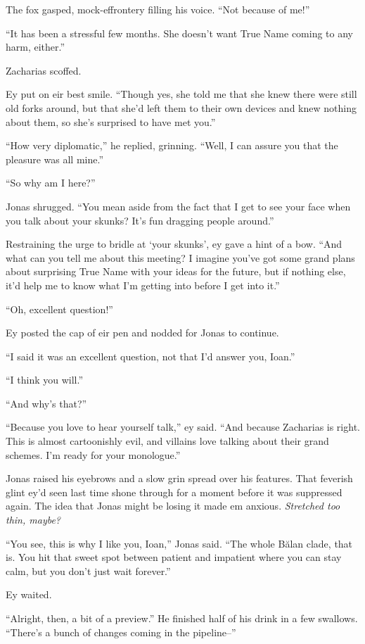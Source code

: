 The fox gasped, mock-effrontery filling his voice. ``Not because of me!''

``It has been a stressful few months. She doesn't want True Name coming to any harm, either.''

Zacharias scoffed.

Ey put on eir best smile. ``Though yes, she told me that she knew there were still old forks around, but that she'd left them to their own devices and knew nothing about them, so she's surprised to have met you.''

``How very diplomatic,'' he replied, grinning. ``Well, I can assure you that the pleasure was all mine.''

``So why am I here?''

Jonas shrugged. ``You mean aside from the fact that I get to see your face when you talk about your skunks? It's fun dragging people around.''

Restraining the urge to bridle at `your skunks', ey gave a hint of a bow. ``And what can you tell me about this meeting? I imagine you've got some grand plans about surprising True Name with your ideas for the future, but if nothing else, it'd help me to know what I'm getting into before I get into it.''

``Oh, excellent question!''

Ey posted the cap of eir pen and nodded for Jonas to continue.

``I said it was an excellent question, not that I'd answer you, Ioan.''

``I think you will.''

``And why's that?''

``Because you love to hear yourself talk,'' ey said. ``And because Zacharias is right. This is almost cartoonishly evil, and villains love talking about their grand schemes. I'm ready for your monologue.''

Jonas raised his eyebrows and a slow grin spread over his features. That feverish glint ey'd seen last time shone through for a moment before it was suppressed again. The idea that Jonas might be losing it made em anxious. \emph{Stretched too thin, maybe?}

``You see, this is why I like you, Ioan,'' Jonas said. ``The whole Bălan clade, that is. You hit that sweet spot between patient and impatient where you can stay calm, but you don't just wait forever.''

Ey waited.

``Alright, then, a bit of a preview.'' He finished half of his drink in a few swallows. ``There's a bunch of changes coming in the pipeline--''

